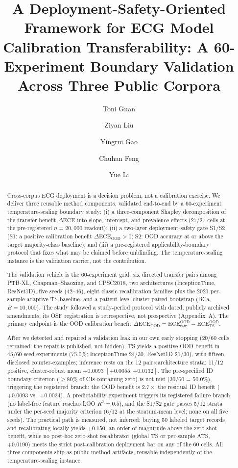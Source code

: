 \documentclass[review,12pt,nonatbib]{elsarticle}
\title{A Deployment-Safety-Oriented Framework for ECG Model
Calibration Transferability: A 60-Experiment Boundary Validation
Across Three Public Corpora}
\author[inst1]{Toni Guan\corref{cor1}}
\author[inst1]{Ziyan Liu}
\author[inst1]{Yingrui Gao}
\author[inst1]{Chuhan Feng}
\author[inst1]{Yue Li}
\affiliation[inst1]{organization={College of Information Technology, Shenyang Institute of Technology},
  city={Shenyang}, state={Liaoning}, country={China}}
\begin{document}
\linenumbers
\begin{frontmatter}

\begin{abstract}
\noindent Cross-corpus ECG deployment is a decision
problem, not a calibration exercise. We deliver three reusable method
components, validated end-to-end by a 60-experiment temperature-scaling
boundary study: (i) a three-component Shapley decomposition of the
transfer benefit $\Delta\text{ECE}$ into slope, intercept, and
prevalence effects (27/27 cells at the pre-registered $n=20{,}000$
readout); (ii) a two-layer deployment-safety gate S1/S2 (S1: a positive
calibration benefit $\Delta\text{ECE}_{\text{OOD}}>0$; S2: OOD accuracy
at or above the target majority-class baseline); and (iii) a
pre-registered applicability-boundary protocol that fixes what may be
claimed before unblinding. The temperature-scaling instance is the
validation carrier, not the contribution.

The validation vehicle is the 60-experiment grid: six directed transfer
pairs among PTB-XL, Chapman--Shaoxing, and CPSC2018, two architectures
(InceptionTime, ResNet1D), five seeds (42--46), eight classic
recalibration families plus the 2021 per-sample adaptive-TS baseline,
and a patient-level cluster paired bootstrap (BCa, $B=10{,}000$). The
study followed a study-period protocol with dated, publicly archived
amendments; its OSF registration is retrospective, not prospective
(Appendix~A). The primary endpoint is the OOD calibration benefit
$\Delta\text{ECE}_{\text{OOD}}=\text{ECE}_{\mathrm{raw}}^{\mathrm{OOD}}
-\text{ECE}_{\mathrm{TS}}^{\mathrm{OOD}}$.

After we detected and repaired a validation leak in our own early
stopping (20/60 cells retrained; the repair is published, not hidden),
TS yields a positive OOD benefit in 45/60 seed experiments (75.0\%;
InceptionTime 24/30, ResNet1D 21/30), with fifteen disclosed
counter-examples; inference rests on the 12 pair$\times$architecture
strata: 11/12 positive, cluster-robust mean $+0.0093$
$[+0.0055,+0.0132]$. The pre-specified ID boundary criterion
($\geq$80\% of CIs containing zero) is not met (30/60 = 50.0\%),
triggering the registered branch: the OOD benefit is $2.7\times$ the
residual ID benefit ($+0.0093$ vs.\ $+0.0034$). A predictability
experiment triggers its registered failure branch (no label-free
feature reaches LOO $R^2=0.5$), and the S1/S2 gate passes 5/12 strata
under the per-seed majority criterion (6/12 at the stratum-mean level;
none on all five seeds). The practical path is measured, not inferred: buying 50
labeled target records and recalibrating locally yields $+0.150$, an
order of magnitude above the zero-shot benefit, while no post-hoc
zero-shot recalibrator (global TS or per-sample ATS, $+0.0190$) meets
the strict post-calibration deployment bar on any of the 60 cells. All
three components ship as public method artifacts, reusable
independently of the temperature-scaling instance.
\end{abstract}


\end{frontmatter}
\end{document}

